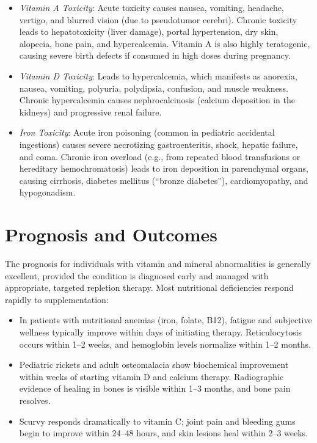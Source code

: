 \begin{itemize}
  \begin{itemize}
  \item \textit{Vitamin A Toxicity}: Acute toxicity causes nausea, vomiting, headache, vertigo, and blurred vision (due to pseudotumor cerebri). Chronic toxicity leads to hepatotoxicity (liver damage), portal hypertension, dry skin, alopecia, bone pain, and hypercalcemia. Vitamin A is also highly teratogenic, causing severe birth defects if consumed in high doses during pregnancy.
  \item \textit{Vitamin D Toxicity}: Leads to hypercalcemia, which manifests as anorexia, nausea, vomiting, polyuria, polydipsia, confusion, and muscle weakness. Chronic hypercalcemia causes nephrocalcinosis (calcium deposition in the kidneys) and progressive renal failure.
  \item \textit{Iron Toxicity}: Acute iron poisoning (common in pediatric accidental ingestions) causes severe necrotizing gastroenteritis, shock, hepatic failure, and coma. Chronic iron overload (e.g., from repeated blood transfusions or hereditary hemochromatosis) leads to iron deposition in parenchymal organs, causing cirrhosis, diabetes mellitus (``bronze diabetes''), cardiomyopathy, and hypogonadism.
  \end{itemize}
\end{itemize}

\section*{Prognosis and Outcomes}
The prognosis for individuals with vitamin and mineral abnormalities is generally excellent, provided the condition is diagnosed early and managed with appropriate, targeted repletion therapy. Most nutritional deficiencies respond rapidly to supplementation:
\begin{itemize}
\item In patients with nutritional anemias (iron, folate, B12), fatigue and subjective wellness typically improve within days of initiating therapy. Reticulocytosis occurs within 1--2 weeks, and hemoglobin levels normalize within 1--2 months.
\item Pediatric rickets and adult osteomalacia show biochemical improvement within weeks of starting vitamin D and calcium therapy. Radiographic evidence of healing in bones is visible within 1--3 months, and bone pain resolves.
\item Scurvy responds dramatically to vitamin C; joint pain and bleeding gums begin to improve within 24--48 hours, and skin lesions heal within 2--3 weeks.
\end{itemize}

